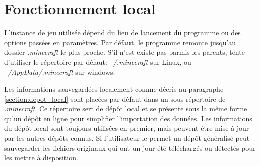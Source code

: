 \documentclass{article}
\begin{document}
\section{Fonctionnement local}
L'instance de jeu utilisée dépend du lieu de lancement du programme ou des options passées en paramètres.
Par défaut, le programme remonte jusqu'au dossier \textit{.minecraft} le plus proche.
S'il n'est existe pas parmis les parents, tente d'utiliser le répertoire par défaut: \textit{~/.minecraft} sur Linux, ou \textit{~/AppData/.minecraft} sur windows.

Les informations sauvegardées localement comme décris au paragraphe \ref{section:depot_local} sont placées par défaut dans un sous répertoire de \textit{.minecraft}.
Ce répertoire sert de dépôt local et se présente sous la même forme qu'un dépôt en ligne pour simplifier l'importation des données.
Les informations du dépôt local sont toujours utilisées en premier, mais peuvent être mise à jour par les autres dépôts connus.
Si l'utilisateur le permet un dépôt généralisé peut sauvegarder les fichiers originaux qui ont un jour été téléchargés ou détectés pour les mettre à disposition.
\end{document}

